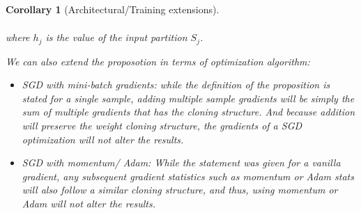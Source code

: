 \documentclass[11pt]{article}
\newtheorem{corollary}{Corollary}[section]
\begin{document}
\begin{corollary}[Architectural/Training extensions]
\begin{itemize}
\begin{align*}
        \end{align*}
        where $h_j$ is the value of the input partition $S_j$.
    \end{itemize}
    We can also extend the proposotion in terms of optimization algorithm:
    \begin{itemize}
        \item SGD with mini-batch gradients: while the definition of the proposition is stated for a single sample, adding multiple sample gradients will be simply the sum of multiple gradients that has the cloning structure. And because addition will preserve the weight cloning structure, the gradients of a SGD optimization will not alter the results. 
        \item SGD with momentum/ Adam: While the statement was given for a vanilla gradient, any subsequent gradient statistics such as momentum or Adam stats will also follow a similar cloning structure, and thus, using momentum or Adam will not alter the results.  
    \end{itemize}
\end{corollary}
\end{document}
